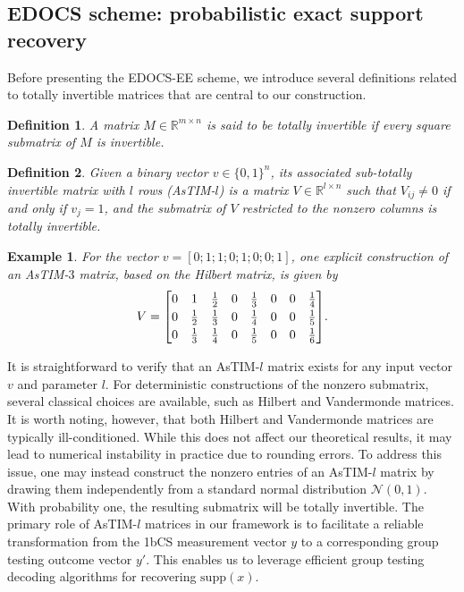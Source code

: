 \documentclass{article}
\newtheorem{definition}{Definition}[subsection]
\newtheorem{example}{Example}[subsection]
\newcommand{\supp}{\mathrm{supp}}
\begin{document}
\subsection{EDOCS scheme: probabilistic exact support recovery}\label{sec:EEE}
Before presenting the EDOCS-EE scheme, we introduce several definitions related to totally invertible matrices that are central to our construction.

\begin{definition}\label{def:tim}
A matrix $M\in\mathbb{R}^{m\times n}$ is said to be \emph{totally invertible} if every square submatrix of $M$ is invertible.
\end{definition}

\begin{definition}
Given a binary vector $v\in \{0,1\}^n$, its \emph{associated sub-totally invertible matrix with $l$ rows} (AsTIM-$l$) is a matrix $V\in\mathbb{R}^{l\times n}$ such that $V_{ij}\neq 0$ if and only if $v_j=1$, and the submatrix of $V$ restricted to the nonzero columns is totally invertible.
\end{definition}

\begin{example}\label{exp:astim}
For the vector $v=[0;1;1;0;1;0;0;1]$, one explicit construction of an AsTIM-$3$ matrix, based on the Hilbert matrix, is given by
\[
V={
   \renewcommand{\arraystretch}{1.2} 
\begin{bmatrix}
0 & 1 & \frac{1}{2} & 0 & \frac{1}{3} & 0 & 0 & \frac{1}{4} \\
0 & \frac{1}{2} & \frac{1}{3} & 0 & \frac{1}{4} & 0 & 0 & \frac{1}{5} \\
0 & \frac{1}{3} & \frac{1}{4} & 0 & \frac{1}{5} & 0 & 0 & \frac{1}{6}
\end{bmatrix}}.
\]
\end{example}

It is straightforward to verify that an AsTIM-$l$ matrix exists for any input vector $v$ and parameter $l$. For deterministic constructions of the nonzero submatrix, several classical choices are available, such as Hilbert and Vandermonde matrices. It is worth noting, however, that both Hilbert and Vandermonde matrices are typically ill-conditioned. While this does not affect our theoretical results, it may lead to numerical instability in practice due to rounding errors. To address this issue, one may instead construct the nonzero entries of an AsTIM-$l$ matrix by drawing them independently from a standard normal distribution $\mathcal{N}(0,1)$. With probability one, the resulting submatrix will be totally invertible.
The primary role of AsTIM-$l$ matrices in our framework is to facilitate a reliable transformation from the 1bCS measurement vector $y$ to a corresponding group testing outcome vector $y'$. This enables us to leverage efficient group testing decoding algorithms for recovering $\supp(x)$. 
\end{document}
